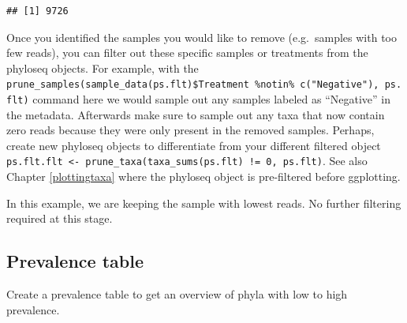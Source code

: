 \documentclass[
]{book}
\newenvironment{Shaded}{\begin{snugshade}}{\end{snugshade}}
\newcommand{\CommentTok}[1]{\textcolor[rgb]{0.56,0.35,0.01}{\textit{#1}}}
\begin{document}
\begin{verbatim}
## [1] 9726
\end{verbatim}

\begin{Shaded}
\end{Shaded}

Once you identified the samples you would like to remove (e.g.~samples with too few reads), you can filter out these specific samples or treatments from the phyloseq objects. For example, with the \texttt{prune\_samples(sample\_data(ps.flt)\$Treatment\ \%notin\%\ c("Negative"),\ ps.flt)} command here we would sample out any samples labeled as ``Negative'' in the metadata. Afterwards make sure to sample out any taxa that now contain zero reads because they were only present in the removed samples. Perhaps, create new phyloseq objects to differentiate from your different filtered object \texttt{ps.flt.flt\ \textless{}-\ prune\_taxa(taxa\_sums(ps.flt)\ !=\ 0,\ ps.flt)}. See also Chapter \ref{plottingtaxa} where the phyloseq object is pre-filtered before ggplotting.

In this example, we are keeping the sample with lowest reads. No further filtering required at this stage.

\hfill\break

\hypertarget{prevalence-table}{%
\subsection{Prevalence table}\label{prevalence-table}}

Create a prevalence table to get an overview of phyla with low to high prevalence.
\end{document}
